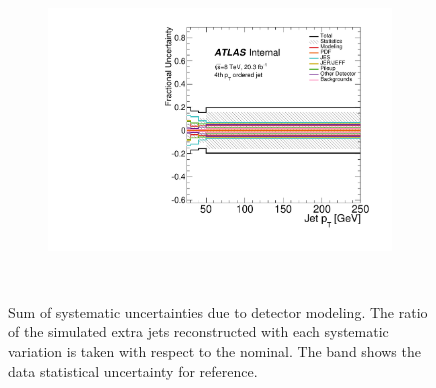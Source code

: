\begin{figure}
\begin{subfigure}[]{0.45\textwidth}
\end{subfigure}
~
\begin{subfigure}[]{0.45\textwidth}
\includegraphics[width=\textwidth]{fig/UnfoldSys/Jet3.pdf}
\end{subfigure}
~
\caption{Sum of systematic uncertainties due to detector modeling. The ratio of the simulated extra jets reconstructed with each systematic variation is taken with respect to the nominal. The band shows the data statistical uncertainty for reference.}
\label{fig:SmoothSys}
\end{figure}

